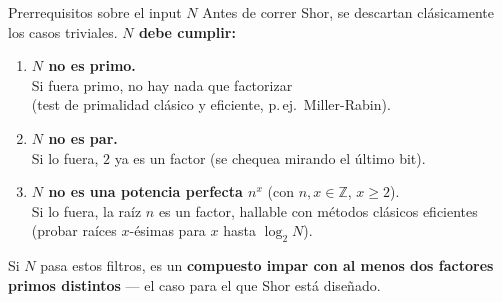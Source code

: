 \documentclass[aspectratio=169]{beamer}
\begin{document}
\begin{frame}{Prerrequisitos sobre el input $N$}
  Antes de correr Shor, se descartan clásicamente los casos triviales.
  \textbf{$N$ debe cumplir:}

  \begin{enumerate}
    \item \textbf{$N$ no es primo.}\\
          Si fuera primo, no hay nada que factorizar\\
          (test de primalidad clásico y eficiente, p.\,ej.\ Miller-Rabin).
    \item \textbf{$N$ no es par.}\\
          Si lo fuera, $2$ ya es un factor (se chequea mirando el último bit).
    \item \textbf{$N$ no es una potencia perfecta $n^x$} (con $n,x\in\mathbb{Z}$,
          $x\geq 2$).\\
          Si lo fuera, la raíz $n$ es un factor, hallable con métodos clásicos
          eficientes (probar raíces $x$-ésimas para $x$ hasta $\log_2 N$).
  \end{enumerate}

  Si $N$ pasa estos filtros, es un \textbf{compuesto impar con al menos dos
  factores primos distintos} — el caso para el que Shor está diseñado.

\end{frame}
\end{document}
